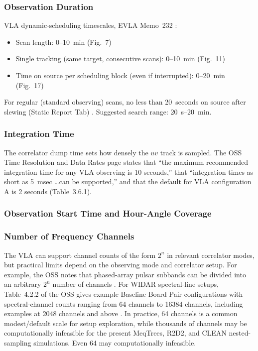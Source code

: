 \documentclass[11pt]{article}
\begin{document}
\subsubsection{Observation Duration}
\label{sec:param-observation-duration}

VLA dynamic-scheduling timescales, EVLA Memo~232 \cite{faes2024evla232}:
\begin{itemize}
    \item Scan length: 0--10~min (Fig.~7)
    \item Single tracking (same target, consecutive scans): 0--10~min (Fig.~11)
    \item Time on source per scheduling block (even if interrupted): 0--20~min (Fig.~17)
\end{itemize}

For regular (standard observing) scans, no less than 20~seconds on source after slewing (Static Report Tab) \cite{nrao-vla-obsguide}.
Suggested search range: 20~s--20~min.

\subsubsection{Integration Time}
\label{sec:param-integration-seconds}

The correlator dump time sets how densely the $uv$ track is sampled.
The OSS Time Resolution and Data Rates page \cite{nrao-vla-tim-res} states that ``the maximum recommended integration time for any VLA observing is 10 seconds,'' that ``integration times as short as 5~msec \ldots can be supported,'' and that the default for VLA configuration A is 2 seconds (Table~3.6.1).

\subsubsection{Observation Start Time and Hour-Angle Coverage}

\subsubsection{Number of Frequency Channels}
\label{sec:param-channel-count}

The VLA can support channel counts of the form $2^n$ in relevant correlator modes, but practical limits depend on the observing mode and correlator setup.
For example, the OSS notes that phased-array pulsar subbands can be divided into an arbitrary $2^n$ number of channels \cite{nrao-vla-oss}.
For WIDAR spectral-line setups, Table~4.2.2 of the OSS gives example Baseline Board Pair configurations with spectral-channel counts ranging from 64 channels to 16384 channels, including examples at 2048 channels and above \cite{nrao-vla-oss}.
In practice, 64 channels is a common modest/default scale for setup exploration, while thousands of channels may be computationally infeasible for the present MeqTrees, R2D2, and CLEAN nested-sampling simulations.
Even 64 may computationally infeasible.
\end{document}
